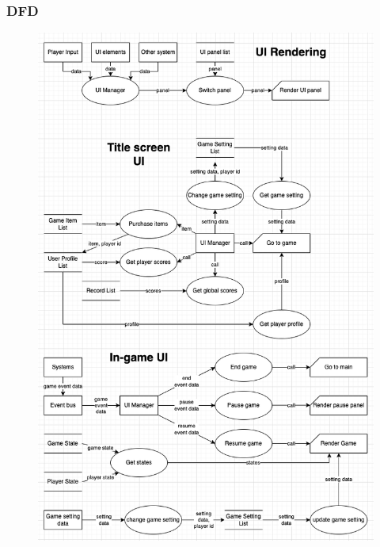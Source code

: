 \documentclass{article}
\begin{document}
\subsubsection{DFD}
\begin{figure}[H]
    \centering
    \includegraphics*[scale=0.4]{UI_DFD.png}
\end{figure}
\end{document}
